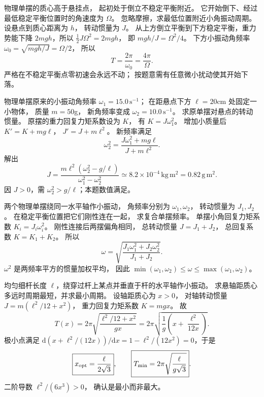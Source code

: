 物理单摆的质心高于悬挂点，
起初处于倒立不稳定平衡附近。
它开始倒下、经过最低稳定平衡位置时的角速度为 $\Omega$。
忽略摩擦，求最低位置附近小角振动周期。
\exsolution
设悬点到质心距离为 $h$，
转动惯量为 $J$。
从上方倒立平衡到下方稳定平衡，重力势能下降
$2mgh$，所以
$\tfrac12J\Omega^2=2mgh$，
即
$mg h/J=\Omega^2/4$。
下方小振动角频率
$\omega_0=\sqrt{mgh/J}=\Omega/2$，
所以
\[
\boxed{T=\frac{2\pi}{\omega_0}
=\frac{4\pi}{\Omega}}.
\]
\excheck 严格在不稳定平衡点零初速会永远不动；
按题意需有任意微小扰动使其开始下落。

物理单摆原来的小振动角频率
$\omega_1=15.0\,\mathrm{s^{-1}}$；
在距悬点下方 $\ell=20$cm 处固定一小物体，
质量 $m=50$g，
新角频率变成
$\omega_2=10.0\,\mathrm{s^{-1}}$。
求原单摆对悬点的转动惯量。
\exsolution
原摆的重力回复力矩系数设为 $K$，
有
$K=J\omega_1^2$。
增加小质量后
$K'=K+mg\ell$，
$J'=J+m\ell^2$。
新频率满足
\[
\omega_2^2=
\frac{J\omega_1^2+mg\ell}{J+m\ell^2}.
\]
解出
\[
\boxed{J=
\frac{m\ell^2(\omega_2^2-g/\ell)}
{\omega_1^2-\omega_2^2}}
\simeq8.2\times10^{-4}\,\mathrm{kg\,m^2}
=0.82\,\mathrm{g\,m^2}.
\]
\excheck 因 $J>0$，需
$\omega_2^2>g/\ell$；本题数值满足。

两个物理单摆绕同一水平轴作小振动，
角频率分别为 $\omega_1,\omega_2$，
转动惯量为 $J_1,J_2$。
在稳定平衡位置把它们刚性连在一起，
求复合单摆频率。
\exsolution
单摆小角回复力矩系数
$K_i=J_i\omega_i^2$。
刚性连接后两摆偏角相同，
总转动惯量
$J=J_1+J_2$，
总回复系数
$K=K_1+K_2$。
所以
\[
\boxed{\omega=
\sqrt{\frac{J_1\omega_1^2+J_2\omega_2^2}
{J_1+J_2}}}.
\]
\excheck $\omega^2$ 是两频率平方的惯量加权平均，
因此 $\min(\omega_1,\omega_2)\le\omega\le\max(\omega_1,\omega_2)$。

均匀细杆长度 $\ell$，绕穿过杆上某点并垂直于杆的水平轴作小振动。
求悬轴距质心多远时周期最短，并求最小周期。
\exsolution
设轴距质心为 $x>0$，
对轴转动惯量
$J=m(\ell^2/12+x^2)$，
重力回复力矩系数 $K=mgx$。
故
\[
T(x)=2\pi\sqrt{\frac{\ell^2/12+x^2}{gx}}
=2\pi\sqrt{\frac1g\left(x+\frac{\ell^2}{12x}\right)}.
\]
极小点满足
$\mathrm d(x+\ell^2/(12x))/\mathrm dx
=1-\ell^2/(12x^2)=0$，于是
\[
\boxed{x_{\rm opt}=\frac{\ell}{2\sqrt3}},
\qquad
\boxed{T_{\min}=2\pi\sqrt{\frac{\ell}{g\sqrt3}}}.
\]
\excheck 二阶导数
$\ell^2/(6x^3)>0$，
确认是最小而非最大。

